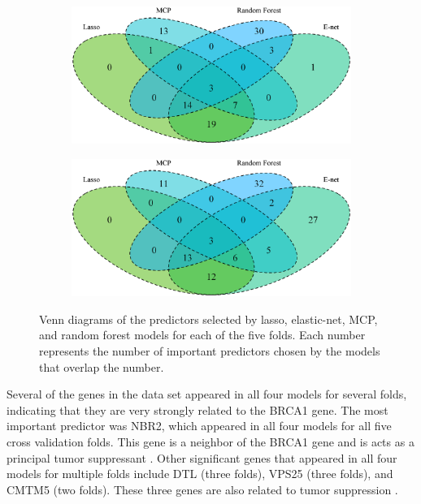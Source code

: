 \documentclass{article}
\begin{document}
\begin{figure}[h!]
\begin{subfigure}[b]{0.45\textwidth}
			\label{fig:venn3}
		\end{subfigure}
		\begin{subfigure}[b]{0.45\textwidth}
			\includegraphics[width=\textwidth]{images/venn/venn4.eps}
			\label{fig:venn4}
		\end{subfigure}
		\hspace{30pt}
		\begin{subfigure}[b]{0.45\textwidth}
			\includegraphics[width=\textwidth]{images/venn/venn5.eps}
			\label{fig:venn5}
		\end{subfigure}
		\captionsetup{width = 5in}
		\caption{Venn diagrams of the predictors selected by lasso, elastic-net, MCP, and random forest models for each of the five folds. Each number represents the number of important predictors chosen by the models that overlap the number.}
		\label{fig:venn}
	\end{figure}
	
	Several of the genes in the data set appeared in all four models for several folds, indicating that they are very strongly related to the BRCA1 gene. The most important predictor was NBR2, which appeared in all four models for all five cross validation folds. This gene is a neighbor of the BRCA1 gene and is acts as a principal tumor suppressant \cite{xiao2016nbr2}. Other significant genes that appeared in all four models for multiple folds include DTL (three folds), VPS25 (three folds), and CMTM5 (two folds). These three genes are also related to tumor suppression \cite{kobayashi2015overexpression, vaccari2005drosophila, shao2007cmtm5}.
	
\end{document}
